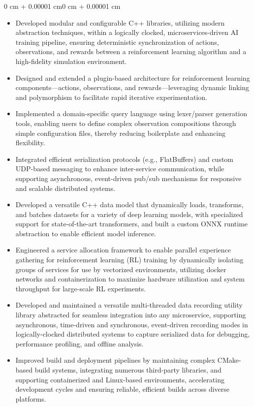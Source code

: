\documentclass[10pt, letterpaper]{article}
\newenvironment{highlights}{
    \begin{itemize}[
        topsep=0.10 cm,
        parsep=0.10 cm,
        partopsep=0pt,
        itemsep=0pt,
        leftmargin=0.4 cm + 10pt
    ]
}{
    \end{itemize}
}
\newenvironment{onecolentry}{
    \begin{adjustwidth}{0 cm + 0.00001 cm}{0 cm + 0.00001 cm}
}{
    \end{adjustwidth}
}
\begin{document}
\vspace{0.10 cm}
\begin{onecolentry}
    \begin{highlights}
        \item Developed modular and configurable C++ libraries, utilizing modern abstraction techniques, within a logically clocked, microservices-driven AI training pipeline, ensuring deterministic synchronization of actions, observations, and rewards between a reinforcement learning algorithm and a high-fidelity simulation environment.
        \item Designed and extended a plugin-based architecture for reinforcement learning components—actions, observations, and rewards—leveraging dynamic linking and polymorphism to facilitate rapid iterative experimentation.
        \item Implemented a domain-specific query language using lexer/parser generation tools, enabling users to define complex observation compositions through simple configuration files, thereby reducing boilerplate and enhancing flexibility.
        \item Integrated efficient serialization protocols (e.g., FlatBuffers) and custom UDP-based messaging to enhance inter-service communication, while supporting asynchronous, event-driven pub/sub mechanisms for responsive and scalable distributed systems.
        \item Developed a versatile C++ data model that dynamically loads, transforms, and batches datasets for a variety of deep learning models, with specialized support for state-of-the-art transformers, and built a custom ONNX runtime abstraction to enable efficient model inference.
        \item Engineered a service allocation framework to enable parallel experience gathering for reinforcement learning (RL) training by dynamically isolating groups of services for use by vectorized environments, utilizing docker networks and containerization to maximize hardware utilization and system throughput for large-scale RL experiments.
        \item Developed and maintained a versatile multi-threaded data recording utility library abstracted for seamless integration into any microservice, supporting asynchronous, time-driven and synchronous, event-driven recording modes in logically-clocked distributed systems to capture serialized data for debugging, performance profiling, and offline analysis.
        \item Improved build and deployment pipelines by maintaining complex CMake-based build systems, integrating numerous third-party libraries, and supporting containerized and Linux-based environments, accelerating development cycles and ensuring reliable, efficient builds across diverse platforms.

\end{highlights}
\end{onecolentry}
\end{document}
